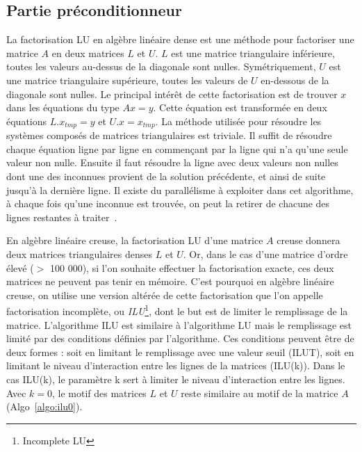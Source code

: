 \subsection{Partie préconditionneur}
La factorisation LU en algèbre linéaire dense est une méthode pour factoriser une matrice $A$ en deux matrices $L$ et $U$.
%
$L$ est une matrice triangulaire inférieure, toutes les valeurs au-dessus de la diagonale sont nulles.
%
Symétriquement, $U$ est une matrice triangulaire supérieure, toutes les valeurs de $U$ en-dessous de la diagonale sont nulles.
%
Le principal intérêt de cette factorisation est de trouver $x$ dans les équations du type $Ax=y$.
%
Cette équation est transformée en deux équations $L.x_{tmp}=y$ et $U.x=x_{tmp}$.
%
La méthode utilisée pour résoudre les systèmes composés de matrices triangulaires est triviale.
%
Il suffit de résoudre chaque équation ligne par ligne en commençant par la ligne qui n'a qu'une seule valeur non nulle.
%
Ensuite il faut résoudre la ligne avec deux valeurs non nulles dont une des inconnues provient de la solution précédente, et ainsi de suite jusqu'à la dernière ligne.
%
Il existe du parallélisme à exploiter dans cet algorithme, à chaque fois qu'une inconnue est trouvée, on peut la retirer de chacune des lignes restantes à traiter~\cite{plasma_lu}.



En algèbre linéaire creuse, la factorisation LU d'une matrice $A$ creuse donnera deux matrices triangulaires denses $L$ et $U$.
%
Or, dans le cas d'une matrice d'ordre élevé ($>$ 100 000), si l'on souhaite effectuer la factorisation exacte, ces deux matrices ne peuvent pas tenir en mémoire.
%
C'est pourquoi en algèbre linéaire creuse, on utilise une version altérée de cette factorisation que l'on appelle factorisation incomplète, ou {\em ILU}\footnote{Incomplete LU}, dont le but est de limiter le remplissage de la matrice.
%
L'algorithme ILU est similaire à l'algorithme LU mais le remplissage est limité par des conditions définies par l'algorithme.
%
Ces conditions peuvent être de deux formes : soit en limitant le remplissage avec une valeur seuil (ILUT), soit en limitant le niveau d'interaction entre les lignes de la matrices (ILU(k)).
%
Dans le cas ILU(k), le paramètre k sert à limiter le niveau d'interaction entre les lignes.
%
Avec $k=0$, le motif des matrices $L$ et $U$ reste similaire au motif de la matrice $A$ (Algo~\ref{algo:ilu0}).


